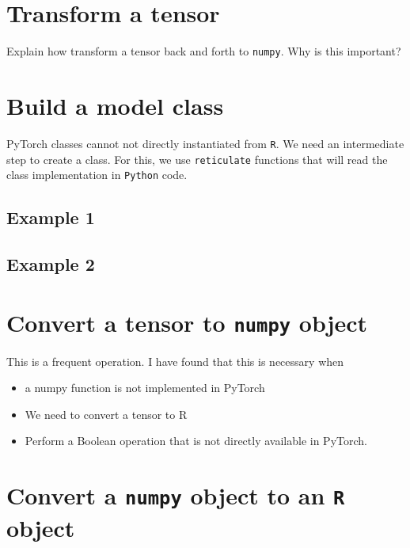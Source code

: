 \documentclass[]{book}
\providecommand{\tightlist}{%
  \setlength{\itemsep}{0pt}\setlength{\parskip}{0pt}}
\begin{document}
\hypertarget{transform-a-tensor}{%
\section{Transform a tensor}\label{transform-a-tensor}}

Explain how transform a tensor back and forth to \texttt{numpy}.
Why is this important?

\hypertarget{build-a-model-class}{%
\section{Build a model class}\label{build-a-model-class}}

PyTorch classes cannot not directly instantiated from \texttt{R}. We need an intermediate step to create a class. For this, we use \texttt{reticulate} functions that will read the class implementation in \texttt{Python} code.

\hypertarget{example-1}{%
\subsection{Example 1}\label{example-1}}

\hypertarget{example-2}{%
\subsection{Example 2}\label{example-2}}

\hypertarget{convert-a-tensor-to-numpy-object}{%
\section{\texorpdfstring{Convert a tensor to \texttt{numpy} object}{Convert a tensor to numpy object}}\label{convert-a-tensor-to-numpy-object}}

This is a frequent operation. I have found that this is necessary when

\begin{itemize}
\tightlist
\item
  a numpy function is not implemented in PyTorch
\item
  We need to convert a tensor to R
\item
  Perform a Boolean operation that is not directly available in PyTorch.
\end{itemize}

\hypertarget{convert-a-numpy-object-to-an-r-object}{%
\section{\texorpdfstring{Convert a \texttt{numpy} object to an \texttt{R} object}{Convert a numpy object to an R object}}\label{convert-a-numpy-object-to-an-r-object}}
\end{document}
